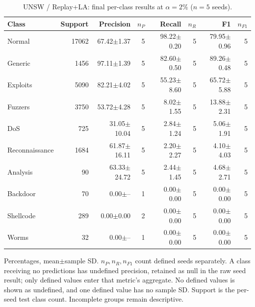 \begin{table}[t]
\centering\scriptsize
\setlength{\tabcolsep}{3.3pt}
\caption{UNSW / Replay+LA: final per-class results at $\alpha=2\%$ ($n=5$ seeds).}\label{tab:forgetting-class-unsw_nb15-replay-la}
\begin{tabular}{lrrrrrrr}
\toprule
Class & Support & Precision & $n_P$ & Recall & $n_R$ & F1 & $n_{F1}$ \\
\midrule
Normal & 17062 & 67.42$\pm$1.37 & 5 & 98.22$\pm$0.20 & 5 & 79.95$\pm$0.96 & 5 \\
Generic & 1456 & 97.11$\pm$1.39 & 5 & 82.60$\pm$0.50 & 5 & 89.26$\pm$0.48 & 5 \\
Exploits & 5090 & 82.21$\pm$4.02 & 5 & 55.23$\pm$8.60 & 5 & 65.72$\pm$5.88 & 5 \\
Fuzzers & 3750 & 53.72$\pm$4.28 & 5 & 8.02$\pm$1.55 & 5 & 13.88$\pm$2.31 & 5 \\
DoS & 725 & 31.05$\pm$10.04 & 5 & 2.84$\pm$1.24 & 5 & 5.06$\pm$1.91 & 5 \\
Reconnaissance & 1684 & 61.87$\pm$16.11 & 5 & 2.20$\pm$2.27 & 5 & 4.10$\pm$4.03 & 5 \\
Analysis & 90 & 63.33$\pm$24.72 & 5 & 2.44$\pm$1.45 & 5 & 4.68$\pm$2.71 & 5 \\
Backdoor & 70 & 0.00$\pm$-- & 1 & 0.00$\pm$0.00 & 5 & 0.00$\pm$0.00 & 5 \\
Shellcode & 289 & 0.00$\pm$0.00 & 2 & 0.00$\pm$0.00 & 5 & 0.00$\pm$0.00 & 5 \\
Worms & 32 & 0.00$\pm$-- & 1 & 0.00$\pm$0.00 & 5 & 0.00$\pm$0.00 & 5 \\
\bottomrule
\end{tabular}
\par\smallskip\begin{minipage}{0.98\textwidth}\scriptsize Percentages, mean$\pm$sample SD. $n_P,n_R,n_{F1}$ count defined seeds separately. A class receiving no predictions has undefined precision, retained as null in the raw seed result; only defined values enter that metric's aggregate. No defined values is shown as undefined, and one defined value has no sample SD. Support is the per-seed test class count. Incomplete groups remain descriptive.\end{minipage}
\end{table}

